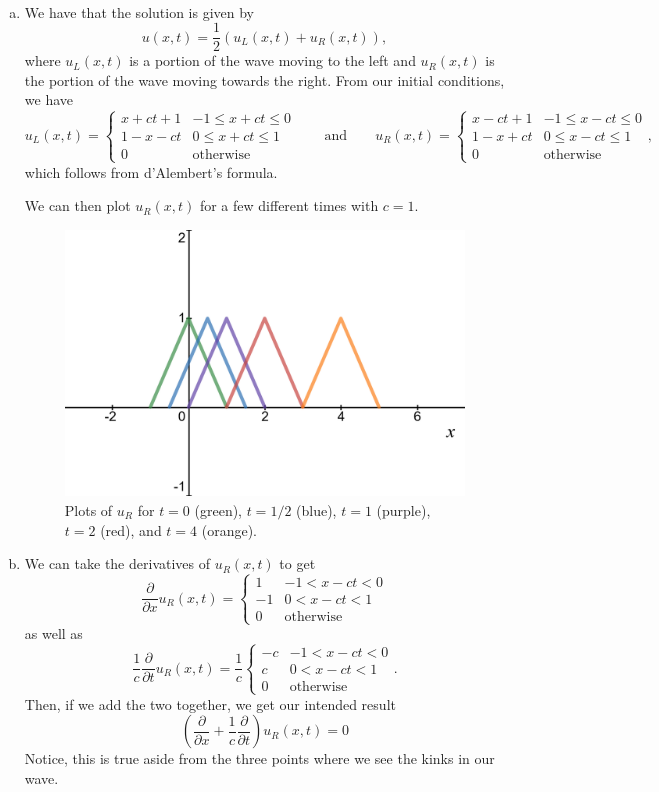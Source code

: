 \documentclass[12pt]{article} %
\begin{document}
\begin{solution}~
\begin{enumerate}[(a)]
    \item We have that the solution is given by
\[
u(x,t) = \frac{1}{2} \left( u_L(x,t) + u_R(x,t)\right),
\]
where $u_L(x,t)$ is a portion of the wave moving to the left and $u_R(x,t)$ is the portion of the wave moving towards the right.  From our initial conditions, we have
\[
u_L(x,t) = \begin{cases} x+ct+1 & -1\leq x+ct \leq 0 \\ 1-x-ct & 0\leq x+ct \leq 1 \\ 0 & \textrm{otherwise} \end{cases} \qquad \textrm{and} \qquad u_R(x,t)=\begin{cases} x-ct+1 & -1\leq x-ct \leq 0 \\ 1-x+ct & 0\leq x-ct \leq 1 \\ 0 & \textrm{otherwise} \end{cases},
\]
which follows from d'Alembert's formula. 

We can then plot $u_R(x,t)$ for a few different times with $c=1$. 
\begin{figure}[H]
    \centering
    \includegraphics[width=.8\textwidth]{right_moving_triangle.png}
    \caption{Plots of $u_R$ for $t=0$ (green), $t=1/2$ (blue), $t=1$ (purple), $t=2$ (red), and $t=4$ (orange).}
\end{figure}
    \item We can take the derivatives of $u_R(x,t)$ to get
    \[
    \frac{\partial}{\partial x} u_R(x,t) = \begin{cases} 1 & -1< x-ct < 0 \\ -1 & 0<x-ct < 1 \\ 0 & \textrm{otherwise} \end{cases}
    \]
    as well as
    \[
    \frac{1}{c}\frac{\partial}{\partial t} u_R(x,t) = \frac{1}{c}\begin{cases} -c & -1< x-ct < 0 \\ c & 0<x-ct < 1 \\ 0 & \textrm{otherwise} \end{cases}.
    \]
    Then, if we add the two together, we get our intended result
    \[
    \left(\frac{\partial}{\partial x} + \frac{1}{c} \frac{\partial}{\partial t} \right)u_R(x,t) = 0
    \]
    Notice, this is true aside from the three points where we see the kinks in our wave.
    

\end{enumerate}
\end{solution}
\end{document}
